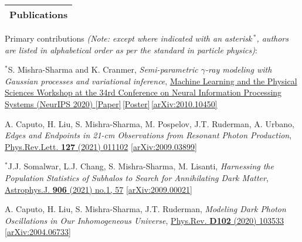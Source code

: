 \documentclass[11pt]{article}
\newenvironment{packed_enumerate}[1][]{
\begin{etaremune}[#1]
  \setlength{\itemsep}{3pt}
  \setlength{\parskip}{0pt}
  \setlength{\parsep}{0pt}}{\end{etaremune}
}
\begin{document}


\noindent
\begin{tabular*}{\textwidth}{l@{\extracolsep{\fill}}}
\large {\sc \Large{Publications}}\\
\hline
\end{tabular*}\vspace{3.5mm}

\noindent
Primary contributions \emph{(Note: except where indicated with an asterisk\,$^*$, authors are listed in alphabetical order as per the standard in particle physics)}:

\begin{packed_enumerate}[start=24]
  \item $^*$S. Mishra-Sharma and K. Cranmer, \emph{Semi-parametric $\gamma$-ray modeling with Gaussian processes and variational inference}, \href{https://ml4physicalsciences.github.io/2019/}{Machine Learning and the Physical Sciences Workshop at the 34rd Conference on Neural Information Processing Systems (NeurIPS 2020) } \href{https://ml4physicalsciences.github.io/2020/files/NeurIPS_ML4PS_2020_20.pdf}{[Paper]}\,\href{https://ml4physicalsciences.github.io/2020/files/NeurIPS_ML4PS_2020_20_poster.pdf}{[Poster]}\,\href{https://arxiv.org/abs/2010.10450}{[arXiv:2010.10450]} 

  \item A. Caputo, H. Liu, S. Mishra-Sharma, M. Pospelov, J.T. Ruderman, A. Urbano, \emph{Edges and Endpoints in 21-cm Observations from Resonant Photon Production},  \href{https://journals.aps.org/prl/abstract/10.1103/PhysRevLett.127.011102}{Phys.Rev.Lett. \textbf{127} (2021) 011102}   \href{https://arxiv.org/abs/2009.03899}{[arXiv:2009.03899]}

  \item $^*$J.J. Somalwar, L.J. Chang, S. Mishra-Sharma, M. Lisanti, \emph{Harnessing the Population Statistics of Subhalos to Search for Annihilating Dark Matter}, \href{https://iopscience.iop.org/article/10.3847/1538-4357/abc87d}{Astrophys.J. \textbf{906} (2021) no.1, 57} \href{https://arxiv.org/abs/2009.00021}{[arXiv:2009.00021]}

  \item A. Caputo, H. Liu, S. Mishra-Sharma, J.T. Ruderman, \emph{Modeling Dark Photon Oscillations in Our Inhomogeneous Universe}, \href{https://journals.aps.org/prd/abstract/10.1103/PhysRevD.102.103533}{Phys.Rev. \textbf{D102} (2020) 103533}   \href{https://arxiv.org/abs/2004.06733}{[arXiv:2004.06733]}


\end{packed_enumerate}
\end{document}
